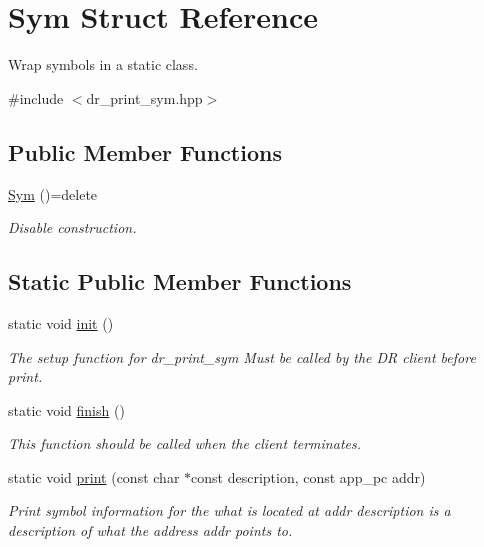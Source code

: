 \hypertarget{struct_sym}{\section{Sym Struct Reference}
\label{struct_sym}
}


Wrap symbols in a static class.  




{\ttfamily \#include $<$dr\-\_\-print\-\_\-sym.\-hpp$>$}

\subsection*{Public Member Functions}
\begin{DoxyCompactItemize}
\item 
\hyperlink{struct_sym_aa2c1e0336fc028030e91c380230a0ae3}{Sym} ()=delete
\begin{DoxyCompactList}\small\item\em Disable construction. \end{DoxyCompactList}\end{DoxyCompactItemize}
\subsection*{Static Public Member Functions}
\begin{DoxyCompactItemize}
\item 
static void \hyperlink{struct_sym_aa14d1ce9dbef3383d591499714c4d164}{init} ()
\begin{DoxyCompactList}\small\item\em The setup function for dr\-\_\-print\-\_\-sym Must be called {\itshape by the D\-R client} before print. \end{DoxyCompactList}\item 
static void \hyperlink{struct_sym_a474eb27bfe01436357e0be478020611c}{finish} ()
\begin{DoxyCompactList}\small\item\em This function should be called when the client terminates. \end{DoxyCompactList}\item 
static void \hyperlink{struct_sym_abe62e638eae7f459e420c7361e41fe71}{print} (const char $\ast$const description, const app\-\_\-pc addr)
\begin{DoxyCompactList}\small\item\em Print symbol information for the what is located at addr description is a description of what the address addr points to. \end{DoxyCompactList}\end{DoxyCompactItemize}
